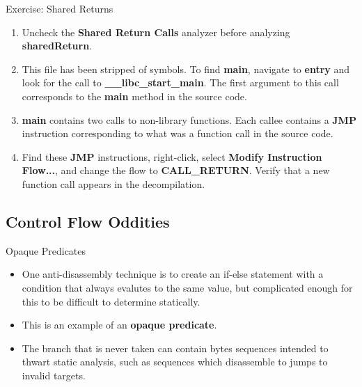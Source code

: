 \documentclass{beamer}
\begin{document}
\begin{frame}
\begin{block}{Exercise: Shared Returns}
\begin{enumerate}
\item Uncheck the \textbf{Shared Return Calls} analyzer before analyzing \textbf{sharedReturn}.
\item This file has been stripped of symbols.  To find \textbf{main}, navigate to \textbf{entry} and look for the call to \textbf{\_\_libc\_start\_main}. The first argument to this 
call corresponds to the \textbf{main} method in the source code.   
\item \textbf{main} contains two calls to non-library functions.  Each callee contains a \textbf{JMP} instruction corresponding to what was a function call in the source code. 
\item Find these \textbf{JMP} instructions, right-click, select \textbf{Modify Instruction Flow...}, and change the flow to \textbf{CALL\_RETURN}. Verify that a new function call appears 
in the decompilation.
\end{enumerate}
\end{block}
\end{frame}

\subsection{Control Flow Oddities}
\begin{frame}
\begin{block}{Opaque Predicates}
\begin{itemize}
\item One anti-disassembly technique is to create an if-else statement with a condition that always evalutes to the same value, but complicated enough for this to be difficult to 
determine statically.  
\item  This is an example of an \textbf{opaque predicate}.
\item  The branch that is never taken can contain bytes sequences intended to thwart static analysis, such as sequences which disassemble to jumps to invalid targets. 
\end{itemize}
\end{block}
\end{frame}
\end{document}
